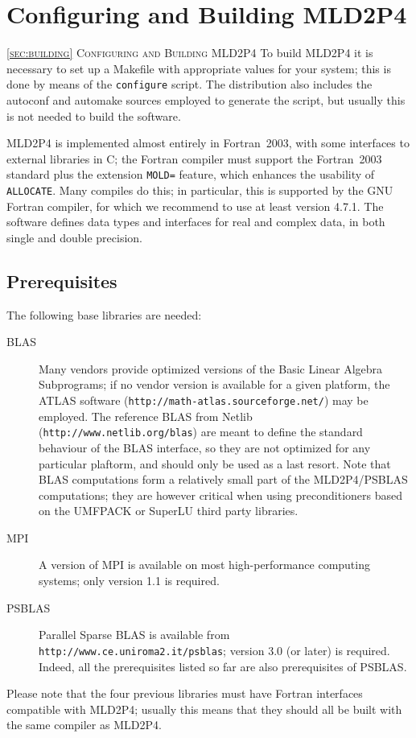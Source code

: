 \section{Configuring and Building MLD2P4\label{sec:building}}
         {\textsc{\ref{sec:building} Configuring and Building MLD2P4}}
To build MLD2P4 it is necessary to set up a Makefile with appropriate
values for your system; this is done by means of the \verb|configure|
script. The distribution also includes the autoconf and automake
sources employed to generate the script, but usually this is not needed
to build the software. 

MLD2P4 is implemented almost entirely in Fortran~2003, with some
interfaces to external libraries in C; the Fortran compiler
must support the Fortran~2003 standard plus the extension \verb|MOLD=|
feature, which
enhances the usability of \verb|ALLOCATE|. 
Many compiles do this; in particular, this is
supported by the GNU Fortran compiler, for which we 
recommend to use at least version 4.7.1. 
The software defines data types and interfaces for
real and complex data, in both single and double precision. 

\subsection{Prerequisites}

The following base libraries are needed: 
\begin{description}
\item[BLAS] \cite{blas3,blas2,blas1} Many vendors provide optimized versions
  of the Basic Linear Algebra Subprograms; if no vendor version is
  available for a given platform, the ATLAS software
  (\verb!http://math-atlas.sourceforge.net/!)
  may be employed.  The reference BLAS from Netlib
  (\verb|http://www.netlib.org/blas|) are meant to define the standard
  behaviour of the BLAS interface, so they are not optimized for any
  particular plaftorm, and should only be used as a last
  resort. Note that BLAS computations form a relatively small part of
  the MLD2P4/PSBLAS computations; they are however critical when using
  preconditioners based on the UMFPACK or SuperLU third party
  libraries.  
\item[MPI] \cite{MPI2,MPI1} A version of MPI is available on most
  high-performance computing systems; only version 1.1 is required.
 \item[PSBLAS] \cite{PSBLASGUIDE,psblas_00} Parallel Sparse BLAS is
  available from \\ \verb|http://www.ce.uniroma2.it/psblas|; version
  3.0   (or later) is required. Indeed, all the prerequisites
  listed so far are also prerequisites of PSBLAS.
\end{description}
Please note that the four previous libraries must have Fortran
interfaces compatible with MLD2P4;
usually this means that they should all be built with the same
compiler as MLD2P4.

